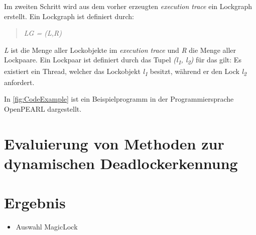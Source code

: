 Im zweiten Schritt wird aus dem vorher erzeugten \textit{execution trace} ein
Lockgraph erstellt. Ein Lockgraph ist definiert durch:
\begin{quote}
\textit{LG = (L,R)}
\end{quote}
\textit{L} ist die Menge aller Lockobjekte im \textit{execution trace} und
\textit{R} die Menge aller Lockpaare. Ein Lockpaar ist definiert durch das Tupel
\textit{(l\textsubscript{1}, l\textsubscript{2})} für das gilt: Es existiert ein
Thread, welcher das Lockobjekt \textit{l\textsubscript{1}} besitzt, während er
den Lock \textit{l\textsubscript{2}} anfordert.

In \cref{fig:CodeExample} ist ein Beispielprogramm in der Programmiersprache
OpenPEARL dargestellt.

\section{Evaluierung von Methoden zur dynamischen Deadlockerkennung}

\section{Ergebnis}\label{Ergebnis}
\begin{itemize}
  \item Auswahl MagicLock\cite{MagicLock}
\end{itemize}